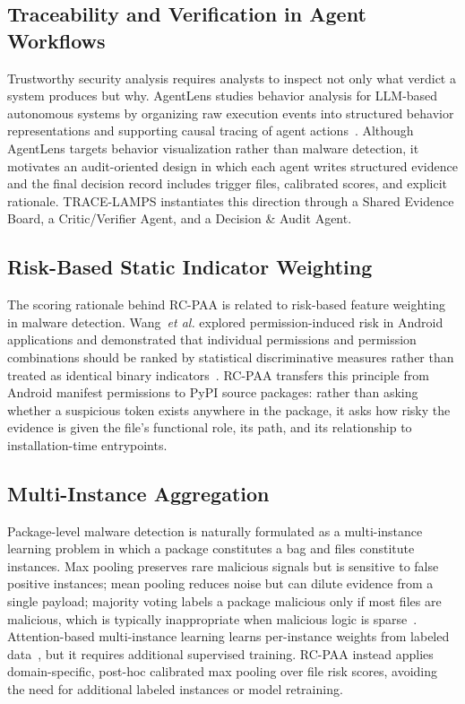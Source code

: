 \documentclass[conference,a4paper]{IEEEtran}
\newcommand{\rcpaa}{RC-PAA}
\newcommand{\tracelamps}{TRACE-LAMPS}
\begin{document}
\subsection{Traceability and Verification in Agent Workflows}
Trustworthy security analysis requires analysts to inspect not only what verdict a system
produces but why. AgentLens studies behavior analysis for LLM-based autonomous systems by
organizing raw execution events into structured behavior representations and supporting
causal tracing of agent actions~\cite{agentlens}. Although AgentLens targets behavior
visualization rather than malware detection, it motivates an audit-oriented design in
which each agent writes structured evidence and the final decision record includes trigger
files, calibrated scores, and explicit rationale. \tracelamps{} instantiates this
direction through a Shared Evidence Board, a Critic/Verifier Agent, and a Decision \&
Audit Agent.

\subsection{Risk-Based Static Indicator Weighting}
The scoring rationale behind \rcpaa{} is related to risk-based feature weighting in
malware detection. Wang~\emph{et al.} explored permission-induced risk in Android
applications and demonstrated that individual permissions and permission combinations
should be ranked by statistical discriminative measures rather than treated as identical
binary indicators~\cite{wang2014permission}. \rcpaa{} transfers this principle from
Android manifest permissions to PyPI source packages: rather than asking whether a
suspicious token exists anywhere in the package, it asks how risky the evidence is given
the file's functional role, its path, and its relationship to installation-time
entrypoints.

\subsection{Multi-Instance Aggregation}
Package-level malware detection is naturally formulated as a multi-instance learning
problem in which a package constitutes a bag and files constitute instances. Max pooling
preserves rare malicious signals but is sensitive to false positive instances; mean
pooling reduces noise but can dilute evidence from a single payload; majority voting
labels a package malicious only if most files are malicious, which is typically
inappropriate when malicious logic is sparse~\cite{ilse2018attention}. Attention-based
multi-instance learning learns per-instance weights from labeled data~\cite{ilse2018attention},
but it requires additional supervised training. \rcpaa{} instead applies domain-specific,
post-hoc calibrated max pooling over file risk scores, avoiding the need for
additional labeled instances or model retraining.
\end{document}
